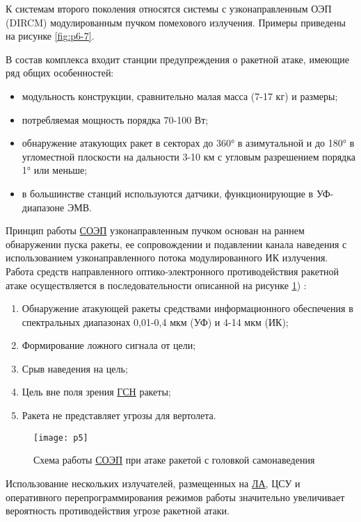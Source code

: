 К  системам второго поколения относятся системы с узконаправленным ОЭП (DIRCM) модулированным пучком помехового излучения. Примеры приведены на рисунке \ref{fig:p6-7}.

В состав комплекса входит станции предупреждения о ракетной атаке, имеющие ряд общих особенностей:
\begin{itemize}
	\item модульность конструкции, сравнительно малая масса (7-17 кг) и размеры;
	\item потребляемая мощность порядка 70-100 Вт;
	\item обнаружение атакующих ракет в секторах до 360° в азимутальной и до 180° в угломестной плоскости на дальности 3-10 км с угловым разрешением порядка 1° или меньше;
	\item в большинстве станций используются датчики, функционирующие в УФ-диапазоне ЭМВ.
\end{itemize}

Принцип работы  \hyperref[acroSOEP]{СОЭП} узконаправленным пучком основан на раннем обнаружении пуска ракеты, ее сопровождении и подавлении канала наведения с использованием узконаправленного потока модулированного ИК излучения. Работа средств направленного оптико-электронного противодействия ракетной атаке осуществляется в последовательности описанной на рисунке \ref{fig:p5}) \cite[]{ForeignMilitary}:

\begin{enumerate}
	\item Обнаружение атакующей ракеты средствами информационного обеспечения в спектральных диапазонах 0,01-0,4 мкм (УФ) и 4-14 мкм (ИК);
	\item Формирование ложного сигнала от цели; 
	\item Срыв наведения на цель; 
	\item Цель вне поля зрения \hyperref[acroGSN]{ГСН} ракеты; 
	\item Ракета не представляет угрозы для вертолета.	
\end{enumerate}

\begin{figure}[ht]
	\centering
	\texttt{[image: p5]} 
	\caption{Схема работы  \hyperref[acroSOEP]{СОЭП} при атаке ракетой с головкой самонаведения}
	\label{fig:p5}
\end{figure}

Использование нескольких излучателей, размещенных на  \hyperref[acroLA]{ЛА}, ЦСУ и оперативного перепрограммирования режимов работы значительно увеличивает вероятность противодействия угрозе ракетной атаки.

